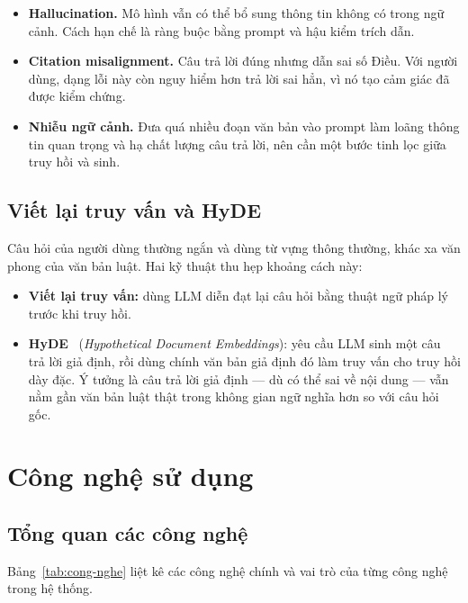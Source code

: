 \documentclass[12pt,a4paper]{report}
\numberwithin{equation}{chapter}
\numberwithin{figure}{chapter}
\numberwithin{table}{chapter}
\begin{document}
\begin{itemize}
    \item \textbf{Hallucination.} Mô hình vẫn có thể bổ sung thông tin không có
    trong ngữ cảnh. Cách hạn chế là ràng buộc bằng prompt và hậu kiểm trích dẫn.
    \item \textbf{Citation misalignment.} Câu trả lời đúng nhưng dẫn sai số Điều.
    Với người dùng, dạng lỗi này còn nguy hiểm hơn trả lời sai hẳn, vì nó tạo cảm
    giác đã được kiểm chứng.
    \item \textbf{Nhiễu ngữ cảnh.} Đưa quá nhiều đoạn văn bản vào prompt làm loãng
    thông tin quan trọng và hạ chất lượng câu trả lời, nên cần một bước tinh lọc
    giữa truy hồi và sinh.
\end{itemize}

\subsection{Viết lại truy vấn và HyDE}
Câu hỏi của người dùng thường ngắn và dùng từ vựng thông thường, khác xa văn
phong của văn bản luật. Hai kỹ thuật thu hẹp khoảng cách này:

\begin{itemize}
    \item \textbf{Viết lại truy vấn:} dùng LLM diễn đạt lại câu hỏi bằng thuật
    ngữ pháp lý trước khi truy hồi.
    \item \textbf{HyDE}~\cite{gao2023hyde} (\textit{Hypothetical Document
    Embeddings}): yêu cầu LLM sinh một câu trả lời giả định, rồi dùng chính văn
    bản giả định đó làm truy vấn cho truy hồi dày đặc. Ý tưởng là câu trả lời giả
    định --- dù có thể sai về nội dung --- vẫn nằm gần văn bản luật thật trong
    không gian ngữ nghĩa hơn so với câu hỏi gốc.
\end{itemize}

\section{Công nghệ sử dụng}

\subsection{Tổng quan các công nghệ}
Bảng~\ref{tab:cong-nghe} liệt kê các công nghệ chính và vai trò của từng công
nghệ trong hệ thống.
\end{document}
